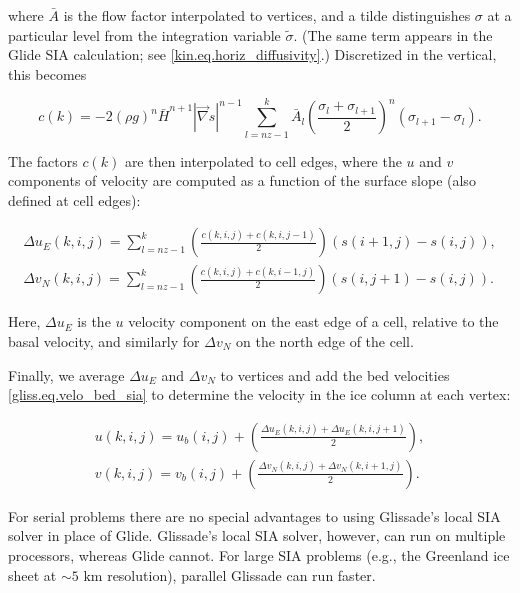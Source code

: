 \noindent
where $\bar{A}$ is the flow factor interpolated to vertices,
and a tilde distinguishes $\sigma$ at a particular level from the integration variable $\tilde{\sigma}$.
(The same term appears in the Glide SIA calculation; see \eqref{kin.eq.horiz_diffusivity}.)
Discretized in the vertical, this becomes

\begin{equation}
  \label{gliss.eq.vert_factor_sia_discrete}
  c(k) = -2(\rho g)^n \bar{H}^{n+1} |\vec\nabla s|^{n-1} 
  \sum\limits_{l=nz-1}^{k} {{{{\bar{A}}}_{l}}}{{\left( \frac{{{\sigma }_{l}}+{{\sigma }_{l+1}}}{2} \right)}^{n}}\left( 
               {{\sigma }_{l+1}}-{{\sigma }_{l}} \right).
\end{equation}

\noindent
The factors $c(k)$ are then interpolated to cell edges, where the $u$ and $v$ 
components of velocity are computed as a function of the surface slope 
(also defined at cell edges):

\begin{equation}
  \label{gliss.eq.velo_interior_sia}
  \begin{split}
    {\Delta {u}_{E}}(k,i,j) = \sum\limits_{l=nz-1}^{k}{\left( \frac{c(k,i,j)+c(k,i,j-1)}{2} \right)\left( s(i+1,j)-s(i,j) \right)}, \\
    {\Delta {v}_{N}}(k,i,j) = \sum\limits_{l=nz-1}^{k}{\left( \frac{c(k,i,j)+c(k,i-1,j)}{2} \right)\left( s(i,j+1)-s(i,j) \right)}.
  \end{split}
\end{equation}

\noindent
Here, $\Delta{u_E}$ is the $u$ velocity component on the east edge of a cell, relative to the basal velocity,
and similarly for $\Delta{v_N}$ on the north edge of the cell.

Finally, we average $\Delta u_E$ and $\Delta v_N$ to vertices and add the bed velocities 
\eqref{gliss.eq.velo_bed_sia} to determine the velocity in the ice column at each vertex:

\begin{equation}
  \label{gliss.eq.velo_sia}
  \begin{split}
    u(k,i,j) = u_b(i,j) + \left( \frac{\Delta {{u}_{E}}(k,i,j) + \Delta {{u}_{E}}(k,i,j+1)}{2} \right), \\
    v(k,i,j) = v_b(i,j) + \left( \frac{\Delta {{v}_{N}}(k,i,j) + \Delta {{v}_{N}}(k,i+1,j)}{2} \right).
  \end{split}
\end{equation}

For serial problems there are no special advantages to using Glissade's local SIA solver 
in place of Glide.  Glissade's local SIA solver, however, can run on multiple processors, 
whereas Glide cannot.  For large SIA problems (e.g., the Greenland
ice sheet at $\sim\text{5 km}$ resolution), parallel Glissade can run faster.


